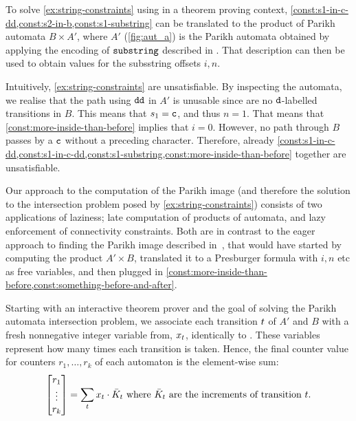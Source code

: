 To solve \cref{ex:string-constraints} using \Calculus{} in a theorem proving
context, \cref{const:s1-in-c-dd,const:s2-in-b,const:s1-substring} can be
translated to the product of Parikh automata $B \times A'$, where $A'$
(\cref{fig:aut_a}) is the Parikh automata obtained by applying the encoding of
$\operatorname{\mathtt{substring}}$ described in \cite{ostrich-plus}. That description can then be used
to obtain values for the subsstring offsets $i, n$.

Intuitively, \cref{ex:string-constraints} are unsatisfiable. By inspecting the
automata, we realise that the path using $\texttt{dd}$ in $A'$ is unusable since
are no $\texttt{d}$-labelled transitions in $B$. This means that $s_1 = \texttt{c}$,
and thus $n = 1$. That means that \cref{const:more-inside-than-before} implies
that $i = 0$. However, no path through $B$ passes by a $\texttt{c}$ without a
preceding character. Therefore, already
\cref{const:s1-in-c-dd,const:s1-in-c-dd,const:s1-substring,const:more-inside-than-before}
together are unsatisfiable.


Our approach to the computation of the Parikh image (and therefore the solution
to the intersection problem posed by \cref{ex:string-constraints}) consists of
two applications of laziness; late computation of products of automata, and lazy
enforcement of connectivity constraints. Both are in contrast to the eager
approach to finding the Parikh image described in~\cite{generate-parikh-image},
that would have started by computing the product $A' \times B$, translated it to
a Presburger formula with $i, n$ etc as free variables, and then plugged in
\cref{const:more-inside-than-before,const:something-before-and-after}.

Starting with an interactive theorem prover and the goal of solving the Parikh
automata intersection problem, we associate each transition $t$ of
$A'$ and $B$ with a fresh nonnegative integer variable from,
$x_t$, identically to \cite{generate-parikh-image}. These
variables represent how many times each transition is taken. Hence, the final
counter value for counters $r_1, \ldots, r_k$ of each automaton is the
element-wise sum:
\begin{equation}\label{eq:counter-sums}
\begin{bmatrix} 
  r_1 \\
  \vdots\\
  r_k \\
\end{bmatrix} = \sum_t x_t \cdot 
  \bar{K}_t \text{ where $\bar{K}_t$ are the increments of transition $t$}.
\end{equation}

